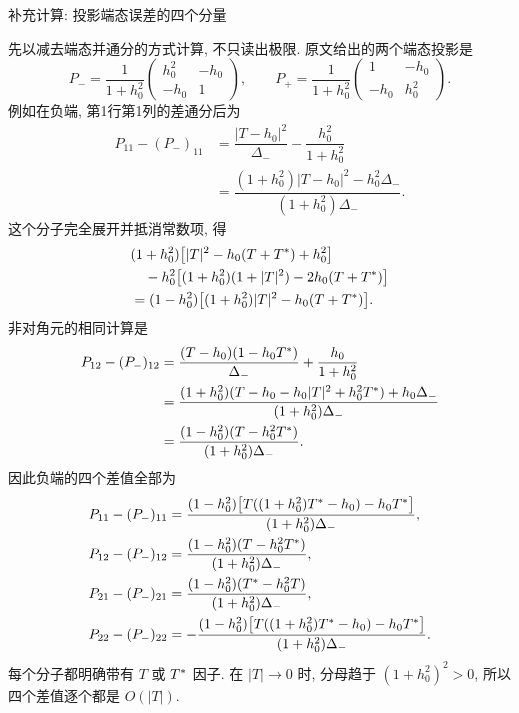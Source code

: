 \par\medskip\noindent 补充计算: 投影端态误差的四个分量\par
\par\smallskip\noindent 先以减去端态并通分的方式计算, 不只读出极限.\quad
原文给出的两个端态投影是
\begin{equation*}
P_- =\dfrac{1}{1+h_0^2}
\begin{pmatrix}h_0^2&-h_0\\-h_0&1\end{pmatrix},
\qquad
P_+ =\dfrac{1}{1+h_0^2}
\begin{pmatrix}1&-h_0\\-h_0&h_0^2\end{pmatrix}.
\end{equation*}
例如在负端, 第1行第1列的差通分后为
\begin{align*}
P_{11}-(P_-)_{11}
&=\dfrac{|T-h_0|^2}{\Delta_-}-\dfrac{h_0^2}{1+h_0^2}\\
&=\dfrac{(1+h_0^2)|T-h_0|^2-h_0^2\Delta_-}
{(1+h_0^2)\Delta_-}.
\end{align*}
这个分子完全展开并抵消常数项, 得
\begin{align*}
&(1+h_0^2)\bigl[|T|^2-h_0(T+{T}^{*})+h_0^2\bigr]\\
&\quad-h_0^2\bigl[(1+h_0^2)(1+|T|^2)-2h_0(T+{T}^{*})\bigr]\\
&=(1-h_0^2)\bigl[(1+h_0^2)|T|^2-h_0(T+{T}^{*})\bigr].
\end{align*}
非对角元的相同计算是
\begin{align*}
P_{12}-(P_-)_{12}
&=\dfrac{(T-h_0)(1-h_0{T}^{*})}{\Delta_-}
+\dfrac{h_0}{1+h_0^2}\\
&=\dfrac{(1+h_0^2)(T-h_0-h_0|T|^2+h_0^2{T}^{*})
+h_0\Delta_-}{(1+h_0^2)\Delta_-}\\
&=\dfrac{(1-h_0^2)(T-h_0^2{T}^{*})}
{(1+h_0^2)\Delta_-}.
\end{align*}
因此负端的四个差值全部为
\begin{align*}
P_{11}-(P_-)_{11}
&=\dfrac{(1-h_0^2)
\bigl[T((1+h_0^2){T}^{*}-h_0)-h_0{T}^{*}\bigr]}
{(1+h_0^2)\Delta_-},\\
P_{12}-(P_-)_{12}
&=\dfrac{(1-h_0^2)(T-h_0^2{T}^{*})}
{(1+h_0^2)\Delta_-},\\
P_{21}-(P_-)_{21}
&=\dfrac{(1-h_0^2)({T}^{*}-h_0^2T)}
{(1+h_0^2)\Delta_-},\\
P_{22}-(P_-)_{22}
&=-\dfrac{(1-h_0^2)
\bigl[T((1+h_0^2){T}^{*}-h_0)-h_0{T}^{*}\bigr]}
{(1+h_0^2)\Delta_-}.
\end{align*}
每个分子都明确带有 $T$ 或 ${T}^{*}$ 因子. 在 $|T|\to0$ 时, 分母趋于 $(1+h_0^2)^2>0$, 所以四个差值逐个都是 $O(|T|)$.


